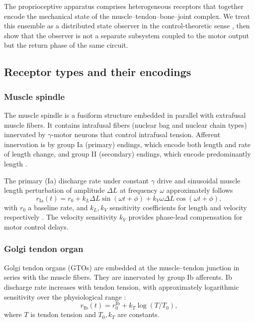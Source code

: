 \documentclass[11pt,twocolumn,a4paper]{article}
\theoremstyle{definition}
\theoremstyle{remark}
\begin{document}
The proprioceptive apparatus comprises heterogeneous receptors that
together encode the mechanical state of the muscle--tendon--bone--joint
complex. We treat this ensemble as a distributed state observer in the
control-theoretic sense \citep{kalman1960,wonham1979}, then show that
the observer is not a separate subsystem coupled to the motor output
but the return phase of the same circuit.

\subsection{Receptor types and their encodings}

\subsubsection{Muscle spindle}

The muscle spindle is a fusiform structure embedded in parallel with
extrafusal muscle fibers. It contains intrafusal fibers (nuclear bag
and nuclear chain types) innervated by $\gamma$-motor neurons that
control intrafusal tension. Afferent innervation is by group Ia
(primary) endings, which encode both length and rate of length change,
and group II (secondary) endings, which encode predominantly length
\citep{matthews1972,hunt1954,prochazka1989}.

The primary (Ia) discharge rate under constant $\gamma$ drive and
sinusoidal muscle length perturbation of amplitude $\Delta L$ at
frequency $\omega$ approximately follows
\begin{equation}
r_{\mathrm{Ia}}(t) = r_0 + k_L \Delta L \sin(\omega t + \phi)
+ k_V \omega \Delta L \cos(\omega t + \phi),
\label{eq:spindle-rate}
\end{equation}
with $r_0$ a baseline rate, and $k_L, k_V$ sensitivity coefficients
for length and velocity respectively \citep{matthews1972,%
prochazka2000}. The velocity sensitivity $k_V$ provides phase-lead
compensation for motor control delays.

\subsubsection{Golgi tendon organ}

Golgi tendon organs (GTOs) are embedded at the muscle--tendon junction
in series with the muscle fibers. They are innervated by group Ib
afferents. Ib discharge rate increases with tendon tension, with
approximately logarithmic sensitivity over the physiological range
\citep{houk1967,prochazka1989}:
\begin{equation}
r_{\mathrm{Ib}}(t) = r_0^{\mathrm{Ib}} + k_T \log(T/T_0),
\end{equation}
where $T$ is tendon tension and $T_0, k_T$ are constants.
\end{document}
